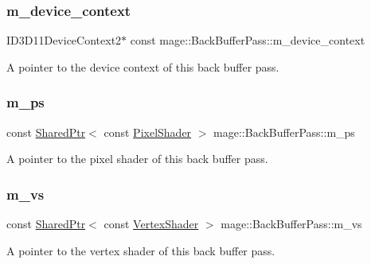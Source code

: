 \subsubsection{\texorpdfstring{m\+\_\+device\+\_\+context}{m\_device\_context}}
{\footnotesize\ttfamily I\+D3\+D11\+Device\+Context2$\ast$ const mage\+::\+Back\+Buffer\+Pass\+::m\+\_\+device\+\_\+context\hspace{0.3cm}{\ttfamily [private]}}

A pointer to the device context of this back buffer pass. \hypertarget{classmage_1_1_back_buffer_pass_a3890afe2710539dfe25ce95be802c2fc}{}\label{classmage_1_1_back_buffer_pass_a3890afe2710539dfe25ce95be802c2fc} 
\subsubsection{\texorpdfstring{m\+\_\+ps}{m\_ps}}
{\footnotesize\ttfamily const \hyperlink{namespacemage_a1e01ae66713838a7a67d30e44c67703e}{Shared\+Ptr}$<$ const \hyperlink{namespacemage_a27ecaf266420ee7a494d64edc0757129}{Pixel\+Shader} $>$ mage\+::\+Back\+Buffer\+Pass\+::m\+\_\+ps\hspace{0.3cm}{\ttfamily [private]}}

A pointer to the pixel shader of this back buffer pass. \hypertarget{classmage_1_1_back_buffer_pass_ac2117930285072c5063881124ba38a5f}{}\label{classmage_1_1_back_buffer_pass_ac2117930285072c5063881124ba38a5f} 
\subsubsection{\texorpdfstring{m\+\_\+vs}{m\_vs}}
{\footnotesize\ttfamily const \hyperlink{namespacemage_a1e01ae66713838a7a67d30e44c67703e}{Shared\+Ptr}$<$ const \hyperlink{classmage_1_1_vertex_shader}{Vertex\+Shader} $>$ mage\+::\+Back\+Buffer\+Pass\+::m\+\_\+vs\hspace{0.3cm}{\ttfamily [private]}}

A pointer to the vertex shader of this back buffer pass. 